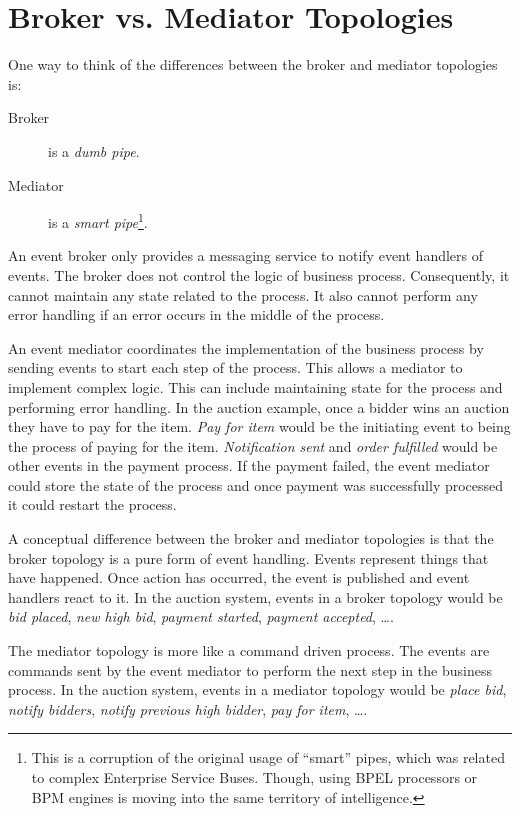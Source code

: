 \section{Broker vs. Mediator Topologies}\label{sec:broker-vs-mediator}

One way to think of the differences between the broker and mediator topologies is:
\begin{description}
    \item[Broker] is a \emph{dumb pipe}.
    \item[Mediator] is a \emph{smart pipe}\footnote{This is a corruption of the original usage of ``smart'' pipes,
    which was related to complex Enterprise Service Buses. Though, using BPEL processors or BPM engines is moving into the same territory of intelligence.}.
\end{description}

An event broker only provides a messaging service to notify event handlers of events.
The broker does not control the logic of business process.
Consequently, it cannot maintain any state related to the process.
It also cannot perform any error handling if an error occurs in the middle of the process.

An event mediator coordinates the implementation of the business process by sending events to start each step of the process.
This allows a mediator to implement complex logic.
This can include maintaining state for the process and performing error handling.
In the auction example, once a bidder wins an auction they have to pay for the item.
\emph{Pay for item} would be the initiating event to being the process of paying for the item.
\emph{Notification sent} and \emph{order fulfilled} would be other events in the payment process.
If the payment failed, the event mediator could store the state of the process
and once payment was successfully processed it could restart the process.

A conceptual difference between the broker and mediator topologies is that the broker topology is a pure form of event handling.
Events represent things that have happened.
Once action has occurred, the event is published and event handlers react to it.
In the auction system, events in a broker topology would be \emph{bid placed},
\emph{new high bid}, \emph{payment started}, \emph{payment accepted}, \dots.

The mediator topology is more like a command driven process.
The events are commands sent by the event mediator to perform the next step in the business process.
In the auction system, events in a mediator topology would be \emph{place bid},
\emph{notify bidders}, \emph{notify previous high bidder}, \emph{pay for item}, \dots.

